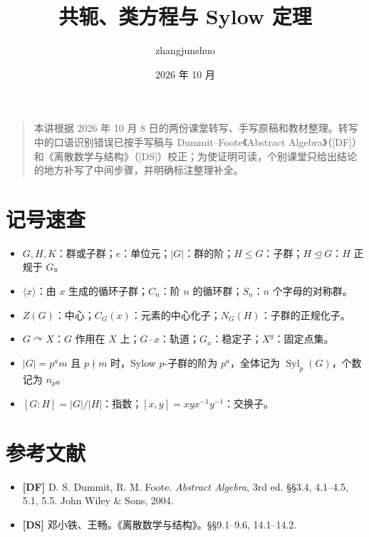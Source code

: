 \documentclass[UTF8,a4paper,11pt]{ctexart}
\title{共轭、类方程与 Sylow 定理}
\author{zhangjunshuo}
\date{2026 年 10 月}
\begin{document}
\maketitle
\begin{quote}
本讲根据 2026 年 10 月 8 日的两份课堂转写、手写原稿和教材整理。转写中的口语识别错误已按手写稿与 Dummit--Foote《Abstract Algebra》（[DF]）和《离散数学与结构》（[DS]）校正；为使证明可读，个别课堂只给出结论的地方补写了中间步骤，并明确标注整理补全。
\end{quote}
\tableofcontents
\clearpage

\section*{记号速查}
\begin{itemize}
\item $G,H,K$：群或子群；$e$：单位元；$|G|$：群的阶；$H\le G$：子群；$H\trianglelefteq G$：$H$ 正规于 $G$。
\item $\langle x\rangle$：由 $x$ 生成的循环子群；$C_n$：阶 $n$ 的循环群；$S_n$：$n$ 个字母的对称群。
\item $Z(G)$：中心；$C_G(x)$：元素的中心化子；$N_G(H)$：子群的正规化子。
\item $G\curvearrowright X$：$G$ 作用在 $X$ 上；$G\cdot x$：轨道；$G_x$：稳定子；$X^g$：固定点集。
\item $|G|=p^a m$ 且 $p\nmid m$ 时，Sylow $p$-子群的阶为 $p^a$，全体记为 $\operatorname{Syl}_p(G)$，个数记为 $n_p$。
\item $[G:H]=|G|/|H|$：指数；$[x,y]=xyx^{-1}y^{-1}$：交换子。
\end{itemize}
\clearpage









\section*{参考文献}
\begin{itemize}
\item \textbf{[DF]} D. S. Dummit, R. M. Foote. \emph{Abstract Algebra}, 3rd ed. §§3.4, 4.1--4.5, 5.1, 5.5. John Wiley \& Sons, 2004.
\item \textbf{[DS]} 邓小铁、王畅。《离散数学与结构》。§§9.1--9.6, 14.1--14.2.
\end{itemize}
\end{document}
